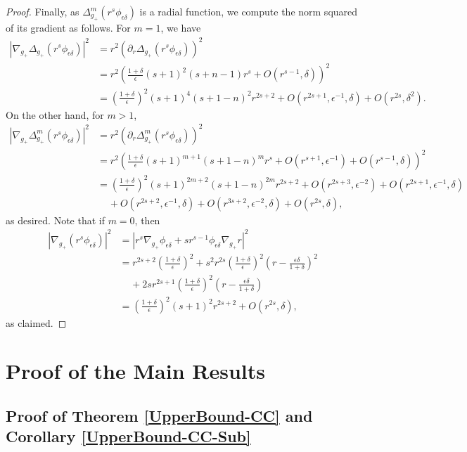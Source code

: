 \documentclass{amsart}
\newcommand{\D}{\delta}
\newcommand{\E}{\epsilon}
\begin{document}
\begin{proof}
    Finally, as $\Delta^m_{g_+}(r^s\phi_{\E\D})$ is a radial function, we compute the norm squared of its gradient as follows. For $m=1$, we have
    \[
    \begin{split}
        |\nabla_{g_+}\Delta_{g_+}(r^s\phi_{\E\D})|^2 &= r^2(\partial_r\Delta_{g_+}(r^s\phi_{\E\D}))^2 \\&=r^2\left(\frac{1+\D}{\E}(s+1)^2(s+n-1)r^{s}+ O(r^{s-1},\D)\right)^2 \\&=\left(\frac{1+\D}{\E}\right)^2(s+1)^4(s+1-n)^2r^{2s+2} +O(r^{2s+1},\E^{-1},\D)+O(r^{2s},\D^2).
    \end{split}
    \]
    On the other hand, for $m>1$, 
    \[
    \begin{split}
    |\nabla_{g_+}\Delta_{g_+}^m(r^s\phi_{\E\D})|^2 &= r^2(\partial_r\Delta_{g_+}^m(r^s\phi_{\E\D}))^2 \\ & = r^2\left(\frac{1+\D}{\E}(s+1)^{m+1}(s+1-n)^mr^s+O(r^{s+1},\E^{-1}) + O(r^{s-1},\D)\right)^2 \\&= \left(\frac{1+\D}{\E}\right)^2(s+1)^{2m+2}(s+1-n)^{2m}r^{2s+2}+O(r^{2s+3},\E^{-2})+ O(r^{2s+1},\E^{-1},\D) \\&\;\;\;\;+ O(r^{2s+2},\E^{-1},\D)+O(r^{3s+2},\E^{-2},\D) +O(r^{2s},\D),
    \end{split}
    \]
    as desired. Note that if $m=0$, then 
    \[
    \begin{split}
    |\nabla_{g_+}(r^s\phi_{\E\D})|^2 &= |r^s\nabla_{g_+}\phi_{\E\D} + sr^{s-1}\phi_{\E\D}\nabla_{g_+}r|^2 \\& = r^{2s+2}\left(\frac{1+\D}{\E}\right)^2 + s^2r^{2s}\left(\frac{1+\D}{\E}\right)^2\left(r - \frac{\E\D}{1+\D}\right)^2 \\&\;\;\;\;+ 2sr^{2s+1}\left(\frac{1+\D}{\E}\right)^2\left(r - \frac{\E\D}{1+\D}\right) \\&= \left(\frac{1+\D}{\E}\right)^2(s+1)^2r^{2s+2} + O(r^{2s},\D),
    \end{split}
    \]
    as claimed.
\end{proof}

\section{Proof of the Main Results}

\subsection{Proof of Theorem \ref{UpperBound-CC} and Corollary \ref{UpperBound-CC-Sub}}
\end{document}
